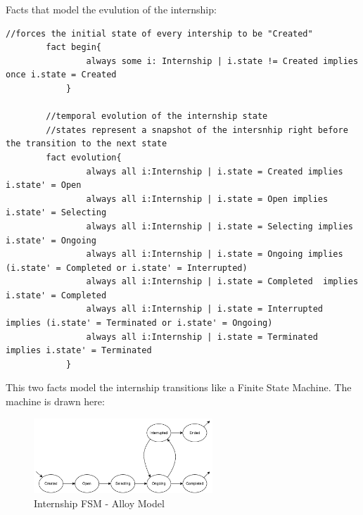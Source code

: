 \par Facts that model the evulution of the internship:

\begin{lstlisting}[language=Alloy]
        //forces the initial state of every intership to be "Created"
        fact begin{
                always some i: Internship | i.state != Created implies once i.state = Created
            }
        
        //temporal evolution of the internship state
        //states represent a snapshot of the intersnhip right before the transition to the next state
        fact evolution{
                always all i:Internship | i.state = Created implies  i.state' = Open
                always all i:Internship | i.state = Open implies  i.state' = Selecting
                always all i:Internship | i.state = Selecting implies  i.state' = Ongoing
                always all i:Internship | i.state = Ongoing implies (i.state' = Completed or i.state' = Interrupted)
                always all i:Internship | i.state = Completed  implies i.state' = Completed
                always all i:Internship | i.state = Interrupted  implies (i.state' = Terminated or i.state' = Ongoing)
                always all i:Internship | i.state = Terminated  implies i.state' = Terminated
            }
\end{lstlisting}

\par This two facts model the internship transitions like a Finite State Machine. The machine is drawn here:

\begin{figure}[H]
    \centering
    \includegraphics[width=0.6\textwidth]{Images/Alloy_images/FSM.pdf}
    \caption{Internship FSM - Alloy Model}
\end{figure}

